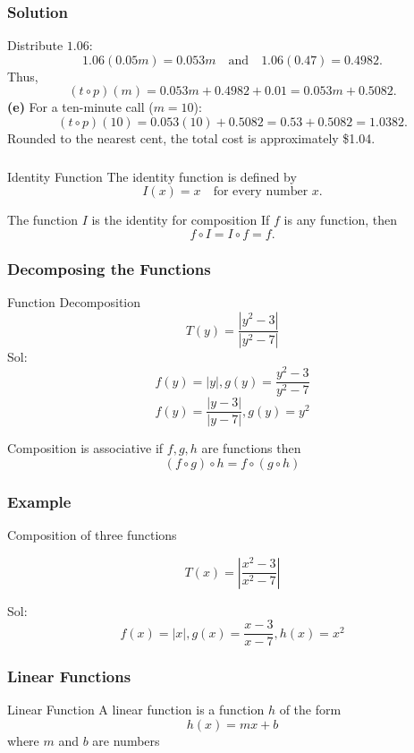 \documentclass{beamer}
\begin{document}
  \begin{frame}
    \frametitle{Solution}
    Distribute \(1.06\):
    \[
    1.06(0.05m)=0.053m \quad \text{and} \quad 1.06(0.47)=0.4982.
    \]
    Thus,
    \[
    (t \circ p)(m)=0.053m+0.4982+0.01=0.053m+0.5082.
    \]
    \textbf{(e)} For a ten-minute call (\(m=10\)):
    \[
    (t \circ p)(10)=0.053(10)+0.5082=0.53+0.5082=1.0382.
    \]
    Rounded to the nearest cent, the total cost is approximately \$1.04.
  \end{frame}
  \begin{frame}
    \frametitle{}
    \begin{block}{Identity Function}
      The identity function is defined by
      \[
      I(x) = x \quad \text{for every number } x.
      \]
      \end{block}

      \begin{alertblock}{The function \(I\) is the identity for composition}
        If \(f\) is any function, then
        \[
        f \circ I = I \circ f = f.
        \]
        \end{alertblock}
  \end{frame}
\begin{frame}
  \frametitle{Decomposing the Functions}
  \begin{exampleblock}{Function Decomposition}
    \[
    T(y) = \frac{|y^{2} -3|}{|y^{2} - 7|}
    \]
    Sol: \pause
    \medskip 
    \[f(y) = |y|, g(y) = \frac{y^{2}-3}{y^{2}-7} \]
    \[ f(y) = \frac{|y-3|}{|y-7|}, g(y) = y^{2}\]
  \end{exampleblock}
  \begin{alertblock}{Composition is associative}
    if \(f,g, h\) are functions then 
    \[(f \circ g) \circ h  = f \circ (g \circ h) \]
  \end{alertblock}
\end{frame}
\begin{frame}
  \frametitle{Example}
  \begin{exampleblock}{Composition of three functions}

    \[T(x) = \left| \frac{x^{2}-3}{x^{2} - 7}  \right| \]

    Sol: \pause
     \[f(x) = |x|, g(x) = \frac{x-3}{x-7}, h(x) = x^{2}\]
    
  \end{exampleblock}
\end{frame}
\begin{frame}
  \frametitle{Linear Functions}
  \begin{block}{Linear Function}
    A linear function is a function \(h\) of the form 
    \[h(x) = mx + b\]
    where \(m\) and \(b\) are numbers
  \end{block}
\end{frame}
\end{document}
